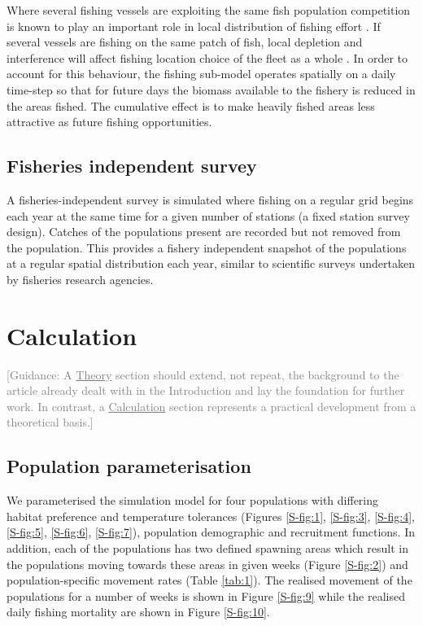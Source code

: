 \documentclass[review]{elsarticle}
\begin{document}
Where several fishing vessels are exploiting the same fish population
competition is known to play an important role in local distribution of fishing
effort \cite{Gillis1998}. If several vessels are fishing on the same patch of
fish, local depletion and interference will affect fishing location choice of
the fleet as a whole \cite{Rijnsdorp2000, Poos2007a}. In order to account for
this behaviour, the fishing sub-model operates spatially on a daily time-step
so that for future days the biomass available to the fishery is reduced in the
areas fished. The cumulative effect is to make heavily fished areas less
attractive as future fishing opportunities. 

\subsection{Fisheries independent survey}

A fisheries-independent survey is simulated where fishing on a regular grid
begins each year at the same time for a given number of stations (a fixed
station survey design). Catches of the populations present are recorded but not
removed from the population. This provides a fishery independent snapshot of
the populations at a regular spatial distribution each year, similar to
scientific surveys undertaken by fisheries research agencies. 

\section{Calculation}

\textcolor{gray}{[Guidance: A \underline{Theory} section should extend, not
repeat, the background to the article already dealt with in the	Introduction
and lay the foundation for further work.  In contrast, a
\underline{Calculation} section represents a practical development from a
theoretical basis.] \\}

\subsection{Population parameterisation}

We parameterised the simulation model for four populations with differing
habitat preference and temperature tolerances (Figures \ref{S-fig:1},
\ref{S-fig:3}, \ref{S-fig:4}, \ref{S-fig:5}, \ref{S-fig:6}, \ref{S-fig:7}),
population demographic and recruitment functions. In addition, each of the
populations has two defined spawning areas which result in the populations
moving towards these areas in given weeks (Figure \ref{S-fig:2}) and
population-specific movement rates (Table \ref{tab:1}). The realised movement
of the populations for a number of weeks is shown in Figure \ref{S-fig:9} while
the realised daily fishing mortality are shown in Figure \ref{S-fig:10}. \\
\end{document}

